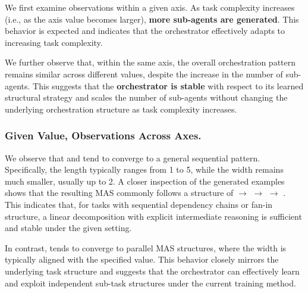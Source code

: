 We first examine observations within a given axis. As task complexity increases (i.e., as the axis value becomes larger), \textbf{more sub-agents are generated}. This behavior is expected and indicates that the orchestrator effectively adapts to increasing task complexity.

We further observe that, within the same axis, the overall orchestration pattern remains similar across different values, despite the increase in the number of sub-agents. This suggests that the \textbf{orchestrator is stable} with respect to its learned structural strategy and scales the number of sub-agents without changing the underlying orchestration structure as task complexity increases.





\subsubsection{Given Value, Observations Across Axes.}

We observe that \depth and \breadth tend to converge to a general sequential pattern. Specifically, the length typically ranges from 1 to 5, while the width remains much smaller, usually up to 2. A closer inspection of the generated examples shows that the resulting MAS commonly follows a structure of  $\rightarrow$  $\rightarrow$  $\rightarrow$ . This indicates that, for tasks with sequential dependency chains or fan-in structure, a linear decomposition with explicit intermediate reasoning is sufficient and stable under the given setting.

In contrast, \myparallel tends to converge to parallel MAS structures, where the width is typically aligned with the specified \myparallel value. This behavior closely mirrors the underlying task structure and suggests that the orchestrator can effectively learn and exploit independent sub-task structures under the current training method.


